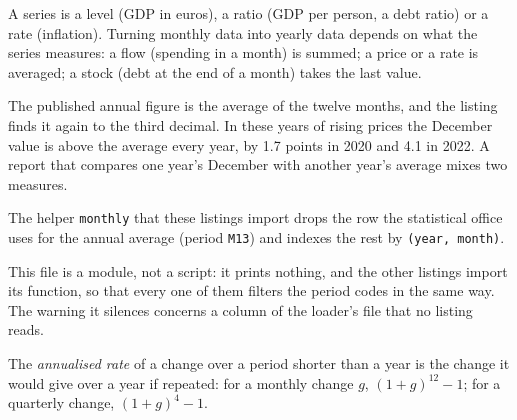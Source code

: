 A series is a level (GDP in euros), a ratio (GDP per person, a debt ratio)
or a rate (inflation). Turning monthly data into yearly data depends on
what the series measures: a flow (spending in a month) is summed; a price
or a rate is averaged; a stock (debt at the end of a month) takes the last
value.

\label{lst:b1:economic-data-python:yearly}

\label{out:b1:economic-data-python:yearly}

The published annual figure is the average of the twelve months, and the
listing finds it again to the third decimal. In these years of rising
prices the December value is above the average every year, by 1.7 points in
2020 and 4.1 in 2022. A report that compares one year's December with
another year's average mixes two measures.

The helper \texttt{monthly} that these listings import drops the row the
statistical office uses for the annual average (period \texttt{M13}) and
indexes the rest by \texttt{(year, month)}.

\label{lst:b1:economic-data-python:cpi-tools}

This file is a module, not a script: it prints nothing, and the other
listings import its function, so that every one of them filters the period
codes in the same way. The warning it silences concerns a column of the
loader's file that no listing reads.

\begin{definition}\label{def:b1:economic-data-python:annualised}
The \emph{annualised rate} of a change over a period shorter than a year is
the change it would give over a year if repeated: for a monthly change $g$,
$(1 + g)^{12} - 1$; for a quarterly change, $(1 + g)^4 - 1$.
\end{definition}

\label{lst:b1:economic-data-python:changes}

